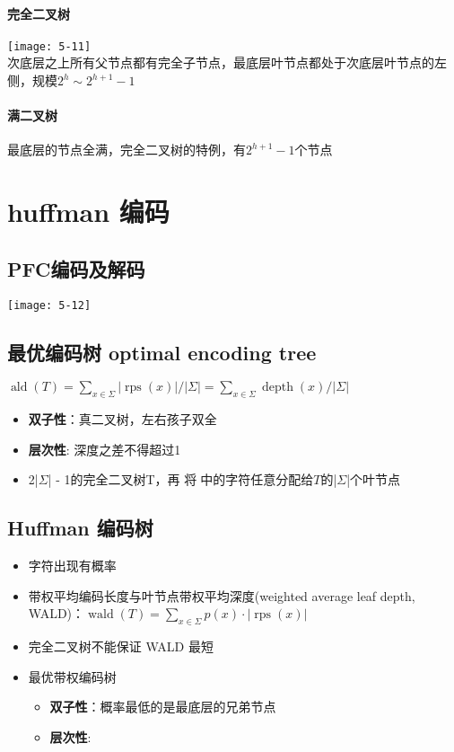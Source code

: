 \paragraph{完全二叉树}
\texttt{[image: 5-11]}\\
次底层之上所有父节点都有完全子节点，最底层叶节点都处于次底层叶节点的左侧，规模$2^h\sim 2^{h+1}-1$

\paragraph{满二叉树}
最底层的节点全满，完全二叉树的特例，有$2^{h+1}-1$个节点

\section{huffman 编码}
\subsection{PFC编码及解码}
\texttt{[image: 5-12]}\\

\subsection{最优编码树 optimal encoding tree}
$\operatorname{ald}(T)=\sum_{x \in \Sigma}|\operatorname{rps}(x)| /|\Sigma|=\sum_{x \in \Sigma} \operatorname{depth}(x) /|\Sigma|$

\begin{itemize}
\item {\bf 双子性}：真二叉树，左右孩子双全
\item {\bf 层次性}: 深度之差不得超过1  
\item 2|$\Sigma$| - 1的完全二叉树T，再 将中的字符任意分配给$T$的|$\Sigma$|个叶节点
\end{itemize}

\subsection{Huffman 编码树}
\begin{itemize}
\item 字符出现有概率
\item 带权平均编码长度与叶节点带权平均深度(weighted average leaf depth, WALD)：$\operatorname{wald}(T)=\sum_{x \in \Sigma} p(x) \cdot|\operatorname{rps}(x)|$
\item 完全二叉树不能保证 WALD 最短
\item 最优带权编码树
\begin{itemize}
\item {\bf 双子性}：概率最低的是最底层的兄弟节点
\item {\bf 层次性}: 
\end{itemize}
\end{itemize}

